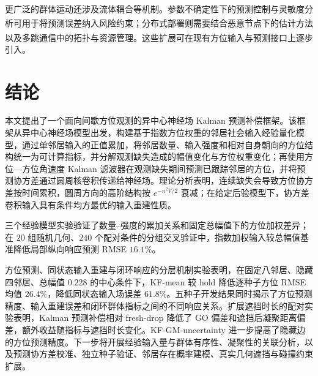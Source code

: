 \documentclass[UTF8,fontset=windows,11pt]{ctexart}
\newcommand{\upcite}[1]{\textsuperscript{\cite{#1}}}
\begin{document}
更广泛的群体运动还涉及流体耦合等机制\upcite{Mao2025}。参数不确定性下的预测控制与灵敏度分析\upcite{Belvedere2025}可用于将预测误差纳入风险约束；分布式部署则需要结合恶意节点下的估计方法\upcite{An2024}以及多跳通信中的拓扑与资源管理\upcite{Gao2024}。这些扩展可在现有方位输入与预测接口上逐步引入。

\section{结论}

本文提出了一个面向间歇方位观测的异中心神经场 Kalman 预测补偿框架。该框架从异中心神经场模型出发，构建基于指数方位权重的邻居社会输入经验量化模型，通过单邻居输入的正值累加，将邻居数量、输入强度和相对自身朝向的方位结构统一为可计算指标，并分解观测缺失造成的幅值变化与方位权重变化；再使用方位—方位角速度 Kalman 滤波器在观测缺失期间预测已跟踪邻居的方位，并将预测协方差通过圆周核卷积传递给神经场。理论分析表明，连续缺失会导致方位协方差按时间累积，圆周方向的高阶结构按 $e^{-n^2V/2}$ 衰减；在给定后验模型下，协方差卷积输入具有条件均方最优的输入重建性质。

三个经验模型实验验证了数量--强度的累加关系和固定总幅值下的方位加权差异；在 $20$ 组随机几何、$240$ 个配对条件的分组交叉验证中，指数加权输入较总幅值基准降低局部纵向响应预测 RMSE $16.1\%$。

方位预测、同状态输入重建与闭环响应的分层机制实验表明，在固定八邻居、隐藏四邻居、总幅值 $0.228$ 的中心条件下，KF-mean 较 hold 降低逐种子方位 RMSE 均值 $26.4\%$，降低同状态输入场误差 $61.8\%$。五种子开发结果同时揭示了方位预测精度、输入重建误差和闭环群体指标之间的不同响应关系。扩展遮挡时长的配对实验表明，Kalman 预测补偿相对 fresh-drop 降低了 GO 偏差和遮挡后凝聚距离偏差，额外收益随指标与遮挡时长变化。KF-GM-uncertainty 进一步提高了隐藏边的方位预测精度。下一步将开展经验输入量与群体有序性、凝聚性的关联分析，以及预测协方差校准、独立种子验证、邻居存在概率建模、真实几何遮挡与碰撞约束扩展。
\end{document}
